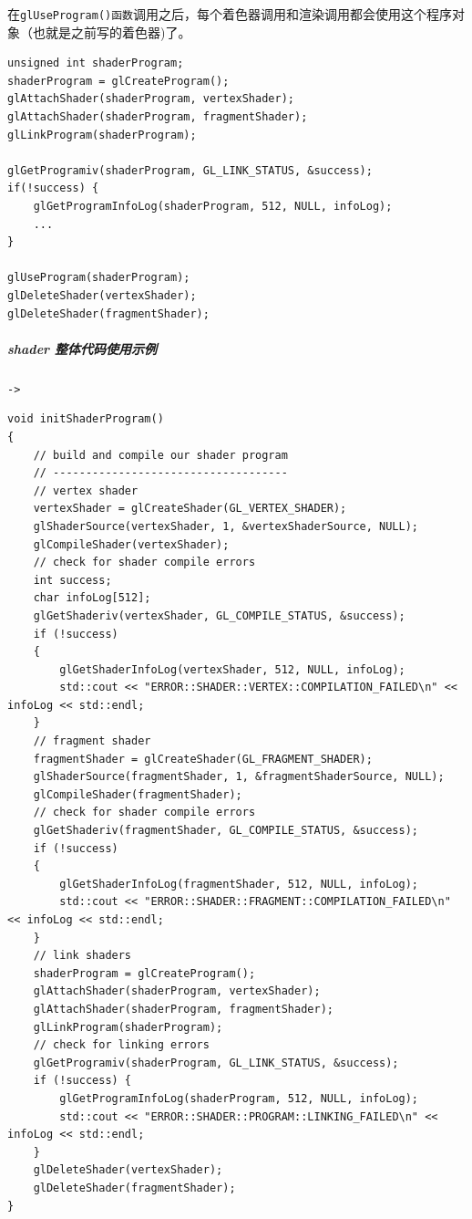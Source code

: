 \documentclass[UTF8,a4paper,12pt]{ctexbook}
\begin{document}
					在\verb|glUseProgram()函数|调用之后，每个着色器调用和渲染调用都会使用这个程序对象（也就是之前写的着色器)了。
					
					\begin{lstlisting}
unsigned int shaderProgram;
shaderProgram = glCreateProgram();
glAttachShader(shaderProgram, vertexShader);
glAttachShader(shaderProgram, fragmentShader);
glLinkProgram(shaderProgram);	

glGetProgramiv(shaderProgram, GL_LINK_STATUS, &success);
if(!success) {
    glGetProgramInfoLog(shaderProgram, 512, NULL, infoLog);
    ...
}			

glUseProgram(shaderProgram);	
glDeleteShader(vertexShader);
glDeleteShader(fragmentShader);
					\end{lstlisting}
				
				
				\subparagraph{shader 整体代码使用示例}
					\verb|->|
					
					\begin{lstlisting}
void initShaderProgram()
{
	// build and compile our shader program
	// ------------------------------------
	// vertex shader
	vertexShader = glCreateShader(GL_VERTEX_SHADER);
	glShaderSource(vertexShader, 1, &vertexShaderSource, NULL);
	glCompileShader(vertexShader);
	// check for shader compile errors
	int success;
	char infoLog[512];
	glGetShaderiv(vertexShader, GL_COMPILE_STATUS, &success);
	if (!success)
	{
		glGetShaderInfoLog(vertexShader, 512, NULL, infoLog);
		std::cout << "ERROR::SHADER::VERTEX::COMPILATION_FAILED\n" << infoLog << std::endl;
	}
	// fragment shader
	fragmentShader = glCreateShader(GL_FRAGMENT_SHADER);
	glShaderSource(fragmentShader, 1, &fragmentShaderSource, NULL);
	glCompileShader(fragmentShader);
	// check for shader compile errors
	glGetShaderiv(fragmentShader, GL_COMPILE_STATUS, &success);
	if (!success)
	{
		glGetShaderInfoLog(fragmentShader, 512, NULL, infoLog);
		std::cout << "ERROR::SHADER::FRAGMENT::COMPILATION_FAILED\n" << infoLog << std::endl;
	}
	// link shaders
	shaderProgram = glCreateProgram();
	glAttachShader(shaderProgram, vertexShader);
	glAttachShader(shaderProgram, fragmentShader);
	glLinkProgram(shaderProgram);
	// check for linking errors
	glGetProgramiv(shaderProgram, GL_LINK_STATUS, &success);
	if (!success) {
		glGetProgramInfoLog(shaderProgram, 512, NULL, infoLog);
		std::cout << "ERROR::SHADER::PROGRAM::LINKING_FAILED\n" << infoLog << std::endl;
	}
	glDeleteShader(vertexShader);
	glDeleteShader(fragmentShader);
}					
					\end{lstlisting}
				
\end{document}
